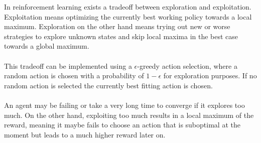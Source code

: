 \documentclass[a4paper, 11pt]{article}
\begin{document}
In reinforcement learning exists a tradeoff between exploration and exploitation.
Exploitation means optimizing the currently best working policy towards a local maximum.
Exploration on the other hand means trying out new or worse strategies to explore unknown states and skip local maxima in the best case towards a global maximum.
\\\\
This tradeoff can be implemented using a $\epsilon$-greedy action selection, where a random action is chosen with a probability of $1-\epsilon$ for exploration purposes.
If no random action is selected the currently best fitting action is chosen.
\\\\
An agent may be failing or take a very long time to converge if it explores too much.
On the other hand, exploiting too much results in a local maximum of the reward, meaning it maybe fails to choose an action that is suboptimal at the moment but leads to a much higher reward later on.
\end{document}
